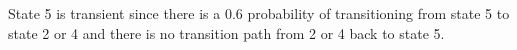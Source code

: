 \documentclass{article}
\begin{document}
                                                                                                                                                                                                                                                                                                                                                                                                                                                                                                                                                                                                                                                                                                                                                                                       

State 5 is transient since there is a 0.6 probability of transitioning from state 5 to state 2 or 4 and there is no transition path from 2 or 4 back to state 5.                                                                                                                                                                                                                                                                                                                                                                                                                                                                                                                                                                                                                                                                                                                                                                                                                                                                                                                                                                                                                                                                                                                                                                                                                                                                                                                                                                                                                                                                                                                                                                                                                                                                                                                                                                                                                                                                                                                                                                                                                                                                                        
\end{document}
